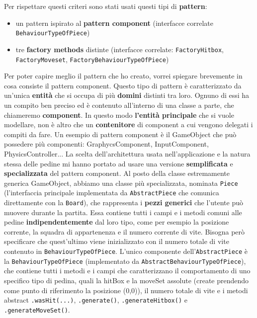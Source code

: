 \documentclass[a4paper,12pt]{report}
\begin{document}
Per rispettare questi criteri sono stati usati questi tipi di \textbf{pattern}:
\begin{itemize}
\item un pattern ispirato al \textbf{pattern component} (interfacce correlate \texttt{BehaviourTypeOfPiece})
\item tre \textbf{factory methods} distinte (interfacce correlate: \texttt{FactoryHitbox}, \texttt{FactoryMoveset}, \texttt{FactoryBehaviourTypeOfPiece})
\end{itemize}

Per poter capire meglio il pattern che ho creato, vorrei spiegare brevemente in cosa consiste il pattern component.
Questo tipo di pattern è caratterizzato da un'unica \textbf{entità} che si occupa di più \textbf{domini} distinti tra loro. Ognuno di essi
ha un compito ben preciso ed è contenuto all'interno di una classe a parte, che chiameremo \textbf{component}. In questo modo \textbf{l'entità
principale} che si vuole modellare, non è altro che un \textbf{contenitore} di component a cui vengono delegati i compiti da fare. Un esempio
di pattern component è il GameObject che può possedere più componenti: GraphycsComponent, InputComponent, PhysicsController...
La scelta dell'architettura usata nell'applicazione e la natura stessa delle pedine mi hanno portato ad usare una versione \textbf{semplificata} e 
\textbf{specializzata} del pattern component. Al posto della classe estremamente generica GameObject, abbiamo una classe più specializzata, nominata \texttt{Piece} 
(l'interfaccia principale implementata da \texttt{AbstractPiece} che comunica direttamente con la \texttt{Board}), che rappresenta i \textbf{pezzi generici} che l'utente può muovere durante la partita. 
Essa contiene tutti i campi e i metodi comuni alle pedine \textbf{indipendentemente} dal loro tipo, come per esempio
la posizione corrente, la squadra di appartenenza e il numero corrente di vite.
Bisogna però specificare che quest'ultimo viene inizializzato con il numero totale di vite contenuto in \texttt{BehaviourTypeOfPiece}. L'unico componente dell'\texttt{AbstractPiece} è la
\texttt{BehaviourTypeOfPiece} (implementato da \texttt{AbstractBehaviourTypeOfPiece}), 
che contiene tutti i metodi e i campi che caratterizzano il comportamento di uno specifico tipo di pedina, quali la hitBox e la moveSet assolute 
(create prendendo come punto di riferimento la posizione (0,0)), il numero totale
di vite e i metodi abstract \texttt{.wasHit(...)}, \texttt{.generate()}, \texttt{.generateHitbox()} e \texttt{.generateMoveSet()}.
\end{document}
